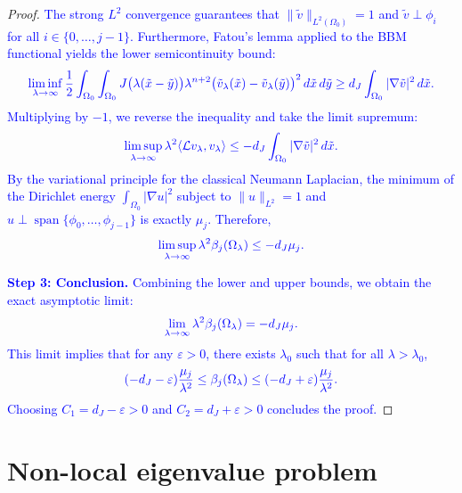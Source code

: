 \documentclass[12pt, a4paper]{article}
\newcommand{\revision}[1]{\textcolor{blue}{#1}}
\theoremstyle{break}
\theoremstyle{break}
\theoremstyle{break}
\theoremstyle{break}
\theoremstyle{break}
\theoremstyle{break}
\theoremstyle{break}
\theoremstyle{break}
\theoremstyle{break}
\begin{document}
\begin{proof}
    \revision{The strong $L^2$ convergence guarantees that $\|\tilde{v}\|_{L^2(\Omega_0)} = 1$ and $\tilde{v} \perp \phi_i$ for all $i \in \{0, \dots, j-1\}$. Furthermore, Fatou's lemma applied to the BBM functional yields the lower semicontinuity bound:}
    \begin{equation}
        \revision{\liminf_{\lambda \to \infty} \frac{1}{2} \int_{\Omega_0} \int_{\Omega_0} J\big(\lambda(\tilde{x}-\tilde{y})\big) \lambda^{n+2} \big( \tilde{v}_\lambda(\tilde{x}) - \tilde{v}_\lambda(\tilde{y}) \big)^2 \, d\tilde{x} \, d\tilde{y} \geq d_J \int_{\Omega_0} |\nabla \tilde{v}|^2 \, d\tilde{x}.}
    \end{equation}
    \revision{Multiplying by $-1$, we reverse the inequality and take the limit supremum:}
    \begin{equation}
        \revision{\limsup_{\lambda \to \infty} \lambda^2 \langle \mathcal{L}v_\lambda, v_\lambda \rangle \leq - d_J \int_{\Omega_0} |\nabla \tilde{v}|^2 \, d\tilde{x}.}
    \end{equation}
    \revision{By the variational principle for the classical Neumann Laplacian, the minimum of the Dirichlet energy $\int_{\Omega_0} |\nabla u|^2$ subject to $\|u\|_{L^2} = 1$ and $u \perp \operatorname{span}\{\phi_0, \dots, \phi_{j-1}\}$ is exactly $\mu_j$. Therefore,}
    \begin{equation}
        \revision{\limsup_{\lambda \to \infty} \lambda^2 \beta_j(\Omega_\lambda) \leq -d_J \mu_j.}
    \end{equation}
    
    \revision{\textbf{Step 3: Conclusion.} Combining the lower and upper bounds, we obtain the exact asymptotic limit:}
    \begin{equation}
        \revision{\lim_{\lambda \to \infty} \lambda^2 \beta_j(\Omega_\lambda) = -d_J \mu_j.}
    \end{equation}
    \revision{This limit implies that for any $\varepsilon > 0$, there exists $\lambda_0$ such that for all $\lambda > \lambda_0$,}
    \begin{equation}
        \revision{(-d_J - \varepsilon) \frac{\mu_j}{\lambda^2} \leq \beta_j(\Omega_\lambda) \leq (-d_J + \varepsilon) \frac{\mu_j}{\lambda^2}.}
    \end{equation}
    \revision{Choosing $C_1 = d_J - \varepsilon > 0$ and $C_2 = d_J + \varepsilon > 0$ concludes the proof.}
\end{proof}

\section{Non-local eigenvalue problem}
\end{document}
